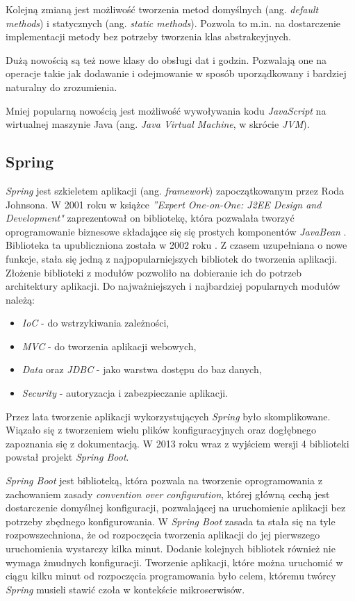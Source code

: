Kolejną zmianą jest możliwość tworzenia metod domyślnych (ang. \textsl{default methods}) i statycznych (ang. \textsl{static methods}). Pozwola to m.in. na dostarczenie implementacji metody bez potrzeby tworzenia klas abstrakcyjnych.

Dużą nowością są też nowe klasy do obsługi dat i godzin. Pozwalają one na operacje takie jak dodawanie i odejmowanie w sposób uporządkowany i bardziej naturalny do zrozumienia.

Mniej popularną nowością jest możliwość wywoływania kodu \textsl{JavaScript} na wirtualnej maszynie Java (ang. \textsl{Java Virtual Machine}, w skrócie \textsl{JVM}).

\subsection{Spring}
\textsl{Spring} jest szkieletem aplikacji (ang. \textsl{framework}) zapoczątkowanym przez Roda Johnsona. W 2001 roku w  książce \textsl{''Expert One-on-One: J2EE Design and Development"} zaprezentował on bibliotekę, która pozwalała tworzyć oprogramowanie biznesowe składające się się prostych komponentów \textsl{JavaBean} \cite{jeedesign}. Biblioteka ta upubliczniona została  w 2002 roku \cite{springinaction}. Z czasem uzupełniana o nowe funkcje, stała się jedną z najpopularniejszych bibliotek do tworzenia aplikacji. Złożenie biblioteki z modułów pozwoliło na dobieranie ich do potrzeb architektury aplikacji. Do najważniejszych i najbardziej popularnych modułów należą:
\begin{itemize}
\item \textsl{IoC} - do wstrzykiwania zależności,
\item \textsl{MVC} - do tworzenia aplikacji webowych,
\item \textsl{Data} oraz \textsl{JDBC} - jako warstwa dostępu do baz danych,
\item \textsl{Security} - autoryzacja i zabezpieczanie aplikacji.
\end{itemize}

Przez lata tworzenie aplikacji wykorzystujących \textsl{Spring} było skomplikowane. Wiązało się z tworzeniem wielu plików konfiguracyjnych oraz dogłębnego zapoznania się z dokumentacją. W 2013 roku wraz z wyjściem wersji 4 biblioteki powstał projekt \textsl{Spring Boot}. 

\textsl{Spring Boot} jest biblioteką, która pozwala na tworzenie oprogramowania z zachowaniem zasady \textsl{convention over configuration}, której główną cechą jest dostarczenie domyślnej konfiguracji, pozwalającej na uruchomienie aplikacji bez potrzeby zbędnego konfigurowania. W \textsl{Spring Boot} zasada ta stała się na tyle rozpowszechniona, że od rozpoczęcia tworzenia aplikacji do jej pierwszego uruchomienia wystarczy kilka minut. Dodanie kolejnych bibliotek również nie wymaga żmudnych konfiguracji. Tworzenie aplikacji, które można uruchomić w ciągu kilku minut od rozpoczęcia programowania było celem, któremu twórcy \textsl{Spring} musieli stawić czoła w kontekście mikroserwisów. 

